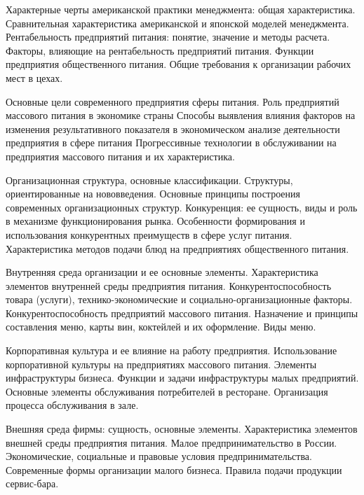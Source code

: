 \documentclass[
	11pt,
	a4paper,
	]
	{article}
\begin{document}
\bigskip

\noindent{} 
	{
		Характерные черты американской практики менеджмента: общая характеристика. Сравнительная характеристика американской и японской моделей менеджмента.
	}{
		Рентабельность предприятий питания: понятие, значение и методы расчета. Факторы, влияющие на рентабельность предприятий питания.
	}{
		Функции предприятия общественного питания. Общие требования к организации рабочих мест в цехах.
	}

\bigskip

\noindent{} 
	{
		Основные цели современного предприятия сферы питания. Роль предприятий массового питания в экономике страны
	}{
		Способы выявления влияния факторов на изменения результативного показателя в экономическом анализе деятельности предприятия в сфере питания
	}{
		Прогрессивные технологии в обслуживании на предприятия массового питания и их характеристика.
	}

\bigskip

\noindent{} 
	{
		Организационная структура, основные классификации. Структуры, ориентированные на нововведения. Основные принципы построения современных организационных структур.
	}{
		Конкуренция: ее сущность, виды и роль в механизме функционирования рынка. Особенности формирования и использования конкурентных преимуществ в сфере услуг питания.
	}{
		Характеристика методов подачи блюд на предприятиях общественного питания.
	}

\bigskip

\noindent{} 
	{
		Внутренняя среда организации и ее основные элементы. Характеристика элементов внутренней среды предприятия питания.
	}{
		Конкурентоспособность товара (услуги), технико-экономические и социально-организационные факторы. Конкурентоспособность предприятий массового питания.
	}{
		Назначение и принципы составления меню, карты вин, коктейлей и их оформление. Виды меню.
	}

\bigskip

\noindent{} 
	{
		Корпоративная культура и ее влияние на работу предприятия. Использование корпоративной культуры на предприятиях массового питания.
	}{
		Элементы инфраструктуры бизнеса. Функции и задачи инфраструктуры малых предприятий.
	}{
		Основные элементы обслуживания потребителей в ресторане. Организация процесса обслуживания в зале.
	}

\bigskip

\noindent{} 
	{
		Внешняя среда фирмы: сущность, основные элементы. Характеристика элементов внешней среды предприятия питания.
	}{
		Малое предпринимательство в России. Экономические, социальные и правовые условия предпринимательства. Современные формы организации малого бизнеса.
	}{
		Правила подачи продукции сервис-бара.
	}
\end{document}
